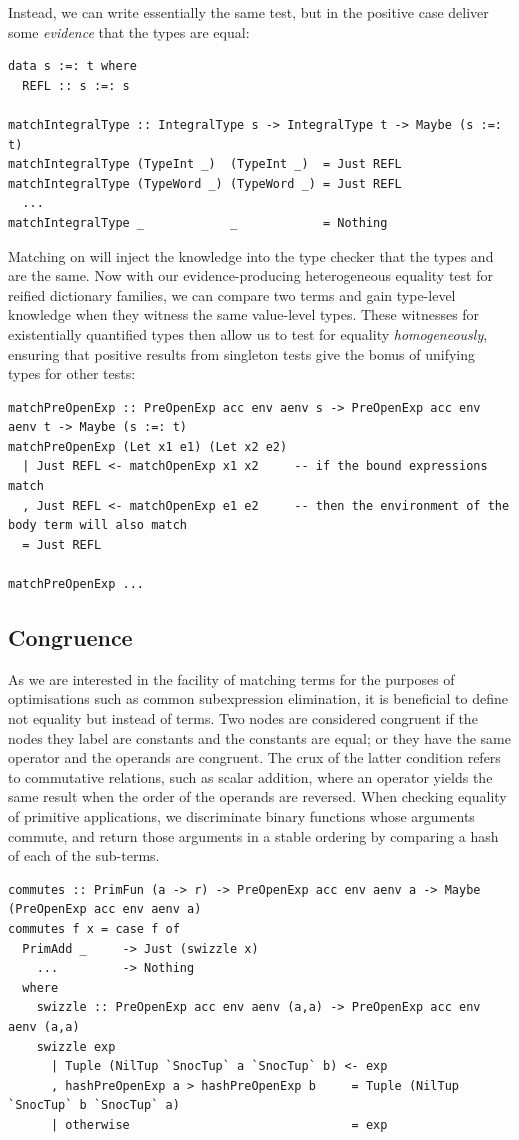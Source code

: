 Instead, we can write essentially the same test, but in the positive case
deliver some \emph{evidence} that the types are equal:
%
\begin{lstlisting}[style=haskell]
data s :=: t where
  REFL :: s :=: s

matchIntegralType :: IntegralType s -> IntegralType t -> Maybe (s :=: t)
matchIntegralType (TypeInt _)  (TypeInt _)  = Just REFL
matchIntegralType (TypeWord _) (TypeWord _) = Just REFL
  ...
matchIntegralType _            _            = Nothing
\end{lstlisting}
%
Matching on  will inject the knowledge into the type
checker that the types  and  are the same. Now with our
evidence-producing heterogeneous equality test for reified dictionary families,
we can compare two terms and gain type-level knowledge when they witness the
same value-level types. These witnesses for existentially quantified types then
allow us to test for equality \emph{homogeneously}, ensuring that positive
results from singleton tests give the bonus of unifying types for other tests:
%
\begin{lstlisting}[style=haskell]
matchPreOpenExp :: PreOpenExp acc env aenv s -> PreOpenExp acc env aenv t -> Maybe (s :=: t)
matchPreOpenExp (Let x1 e1) (Let x2 e2)
  | Just REFL <- matchOpenExp x1 x2     -- if the bound expressions match
  , Just REFL <- matchOpenExp e1 e2     -- then the environment of the body term will also match
  = Just REFL

matchPreOpenExp ...
\end{lstlisting}


\subsection{Congruence}

As we are interested in the facility of matching terms for the purposes of
optimisations such as common subexpression elimination, it is beneficial to
define not equality but instead  of terms. Two nodes are
considered congruent if the nodes they label are constants and the constants are
equal; or they have the same operator and the operands are congruent. The crux
of the latter condition refers to commutative relations, such as scalar
addition, where an operator yields the same result when the order of the
operands are reversed. When checking equality of primitive applications, we
discriminate binary functions whose arguments commute, and return those
arguments in a stable ordering by comparing a hash of each of the
sub-terms.
%
\begin{lstlisting}[style=haskell]
commutes :: PrimFun (a -> r) -> PreOpenExp acc env aenv a -> Maybe (PreOpenExp acc env aenv a)
commutes f x = case f of
  PrimAdd _     -> Just (swizzle x)
    ...         -> Nothing
  where
    swizzle :: PreOpenExp acc env aenv (a,a) -> PreOpenExp acc env aenv (a,a)
    swizzle exp
      | Tuple (NilTup `SnocTup` a `SnocTup` b) <- exp
      , hashPreOpenExp a > hashPreOpenExp b     = Tuple (NilTup `SnocTup` b `SnocTup` a)
      | otherwise                               = exp
\end{lstlisting}


